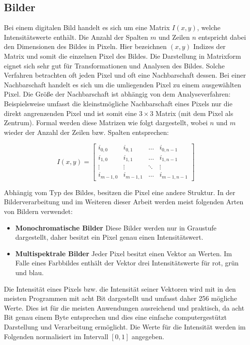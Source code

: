 \subsection{Bilder}

Bei einem digitalen Bild handelt es sich um eine Matrix $I(x, y)$, welche Intensitätswerte enthält. Die Anzahl der Spalten $m$ und Zeilen $n$ entspricht dabei den Dimensionen des Bildes in Pixeln. Hier bezeichnen $(x, y)$ Indizes der Matrix und somit die einzelnen Pixel des Bildes. Die Darstellung in Matrixform eignet sich  sehr gut für Transformationen und Analysen des Bildes. Solche Verfahren betrachten oft jeden Pixel und oft eine Nachbarschaft dessen. Bei einer Nachbarschaft handelt es sich um die umliegenden Pixel zu einem ausgewählten Pixel. Die Größe der Nachbarschaft ist abhängig von dem Analyseverfahren: Beispielsweise umfasst die kleinstmögliche Nachbarschaft eines Pixels nur die direkt angrenzenden Pixel und ist somit eine $3 \times 3$ Matrix (mit dem Pixel als Zentrum). Formal werden diese Matrizen wie folgt dargestellt, wobei $n$ und $m$ wieder der Anzahl der Zeilen bzw. Spalten entsprechen:

$$
I(x, y) = \begin{bmatrix}
i_{0, 0}   & i_{0, 1}	& \dots	 & i_{0, n-1}   \\
i_{1, 0}   & i_{1, 1}   & \dots  & i_{1, n-1}   \\
\vdots	   & \vdots 	& \ddots & \vdots       \\
i_{m-1, 0} & i_{m-1, 1} & \dots	 & i_{m-1, n-1}
\end{bmatrix}
$$ 

Abhängig vom Typ des Bildes, besitzen die Pixel eine andere Struktur. In der Bilderverarbeitung und im Weiteren dieser Arbeit werden meist folgenden Arten von Bildern verwendet:
\begin{itemize}
	\item \textbf{Monochromatische Bilder} Diese Bilder werden nur in Graustufe dargestellt, daher besitzt ein Pixel genau einen Intensitätswert.
	\item \textbf{Multispektrale Bilder} Jeder Pixel besitzt einen Vektor an Werten. Im Falle eines Farbbildes enthält der Vektor drei Intensitätswerte für rot, grün und blau.
\end{itemize}
Die Intensität eines Pixels bzw. die Intensität seiner Vektoren wird mit in den meisten Programmen mit acht Bit dargestellt und umfasst daher 256 mögliche Werte. Dies ist für die meisten Anwendungen ausreichend und praktisch, da acht Bit genau einem Byte entsprechen und dies eine einfache computergestützt Darstellung und Verarbeitung ermöglicht. Die Werte für die Intensität werden im Folgenden normalisiert im Intervall $[0, 1]$ angegeben. 

